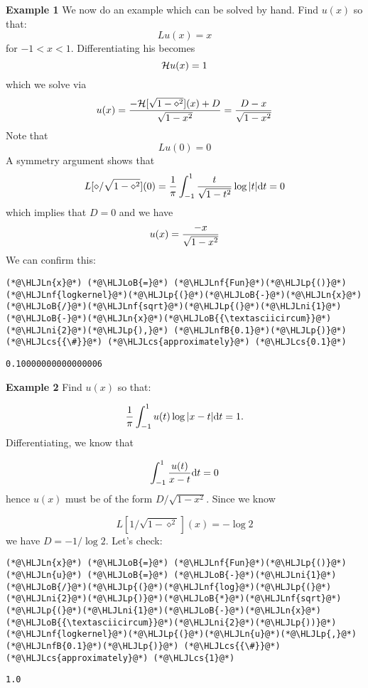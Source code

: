 \documentclass[12pt,landscape]{article}
\newcommand{\HLJLn}[1]{#1}
\newcommand{\HLJLnf}[1]{\textcolor[RGB]{66,102,213}{#1}}
\newcommand{\HLJLnfB}[1]{\textcolor[RGB]{59,151,46}{#1}}
\newcommand{\HLJLni}[1]{\textcolor[RGB]{59,151,46}{#1}}
\newcommand{\HLJLoB}[1]{\textcolor[RGB]{102,102,102}{\textbf{#1}}}
\newcommand{\HLJLp}[1]{#1}
\newcommand{\HLJLcs}[1]{\textcolor[RGB]{153,153,119}{\textit{#1}}}
\def\D{ {\rm d} }
\def\HH{ {\cal H} }
\def\dt{\D t}
\begin{document}
{\textbf{Example 1} We now do an example which can be solved by hand. Find $u(x)$ so that:
\[
L u(x) = x
\]
for $-1 < x < 1$. Differentiating his becomes
\[
\HH u(x) = 1
\]
which we solve via
\[
u(x) = {- \HH[\sqrt{1-\diamond^2}](x) + D \over \sqrt{1-x^2}} = {D-x \over \sqrt{1-x^2}}
\]
Note that
\[
L u(0) = 0
\]
A symmetry argument shows that
\[
L [\diamond/\sqrt{1-\diamond^2}](0) = {1 \over \pi} \int_{-1}^1 {t \over \sqrt{1-t^2}} \log|t| \D t = 0
\]
which implies that $D = 0$ and we have
\[
u(x) = {-x \over \sqrt{1-x^2}}
\]
We can confirm this:
\begin{lstlisting}
(*@\HLJLn{x}@*) (*@\HLJLoB{=}@*) (*@\HLJLnf{Fun}@*)(*@\HLJLp{()}@*)
(*@\HLJLnf{logkernel}@*)(*@\HLJLp{(}@*)(*@\HLJLoB{-}@*)(*@\HLJLn{x}@*)(*@\HLJLoB{/}@*)(*@\HLJLnf{sqrt}@*)(*@\HLJLp{(}@*)(*@\HLJLni{1}@*)(*@\HLJLoB{-}@*)(*@\HLJLn{x}@*)(*@\HLJLoB{{\textasciicircum}}@*)(*@\HLJLni{2}@*)(*@\HLJLp{),}@*) (*@\HLJLnfB{0.1}@*)(*@\HLJLp{)}@*) (*@\HLJLcs{{\#}}@*) (*@\HLJLcs{approximately}@*) (*@\HLJLcs{0.1}@*)
\end{lstlisting}

\begin{lstlisting}
0.10000000000000006
\end{lstlisting}


\textbf{Example 2} Find $u(x)$ so that:

\[
{1 \over \pi} \int_{-1}^1 u(t) \log | x-t| \dt = 1.
\]
Differentiating, we know that

\[
\int_{-1}^1 {u(t) \over x-t} \dt = 0
\]
hence $u(x)$ must be of the form ${D / \sqrt{1-x^2}}$.  Since we know

\[
L[{1 /\sqrt{1-\diamond^2}}](x) = - \log 2
\]
we have $D = -1/\log 2$. Let's check:


\begin{lstlisting}
(*@\HLJLn{x}@*) (*@\HLJLoB{=}@*) (*@\HLJLnf{Fun}@*)(*@\HLJLp{()}@*)
(*@\HLJLn{u}@*) (*@\HLJLoB{=}@*) (*@\HLJLoB{-}@*)(*@\HLJLni{1}@*)(*@\HLJLoB{/}@*)(*@\HLJLp{(}@*)(*@\HLJLnf{log}@*)(*@\HLJLp{(}@*)(*@\HLJLni{2}@*)(*@\HLJLp{)}@*)(*@\HLJLoB{*}@*)(*@\HLJLnf{sqrt}@*)(*@\HLJLp{(}@*)(*@\HLJLni{1}@*)(*@\HLJLoB{-}@*)(*@\HLJLn{x}@*)(*@\HLJLoB{{\textasciicircum}}@*)(*@\HLJLni{2}@*)(*@\HLJLp{))}@*)
(*@\HLJLnf{logkernel}@*)(*@\HLJLp{(}@*)(*@\HLJLn{u}@*)(*@\HLJLp{,}@*) (*@\HLJLnfB{0.1}@*)(*@\HLJLp{)}@*) (*@\HLJLcs{{\#}}@*) (*@\HLJLcs{approximately}@*) (*@\HLJLcs{1}@*)
\end{lstlisting}

\begin{lstlisting}
1.0
\end{lstlisting}


}
\end{document}
